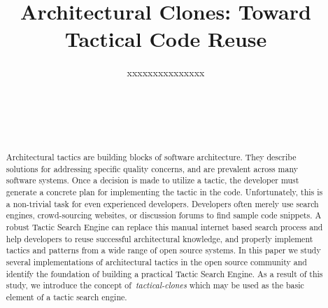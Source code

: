\documentclass{sig-alternate}
\newcommand{\dan}[1]{\textcolor{blue}{{\it [Dan says: #1]}}}
\newif\ifisnopii
\begin{document}
\title{Architectural Clones: Toward Tactical Code Reuse}



\ifisnopii %
\author{
%
\alignauthor
Mehdi Mirakhorli and Daniel E. Krutz\\ 	
	\affaddr{Software Engineering Department}\\
       \affaddr{Rochester Institute of Technology}\\
       \affaddr{1 Lomb Memorial Drive}\\
       \affaddr{Rochester, NY, USA} \\
       \email{\{mxmvse, dxkvse\}@rit.edu}
       \alignauthor
} %

\else %
\author{
%
\alignauthor
xxxxxxxxxxxxxxx\\ 	
	\\
       \\
       \\
        \\
       \alignauthor
} %
\fi %


\maketitle

\begin{abstract}
Architectural tactics are building blocks of software architecture. They describe solutions for addressing specific quality concerns, and are prevalent across many software systems. Once a decision is made to utilize a tactic, the developer must generate a concrete plan for implementing the tactic in the code. Unfortunately, this is a non-trivial task for even experienced developers. Developers often merely use search engines, crowd-sourcing websites, or discussion forums to find sample code snippets. A robust Tactic Search Engine can replace this manual internet based search process and help developers to reuse successful architectural knowledge, and properly implement tactics and patterns from a wide range of open source systems. In this paper we study several implementations of architectural tactics in the open source community and identify the foundation of building a practical Tactic Search Engine. As a result of this study, we introduce the concept of~\emph{tactical-clones} which may be used as the basic element of a tactic search engine. %


\end{abstract}
\end{document}
